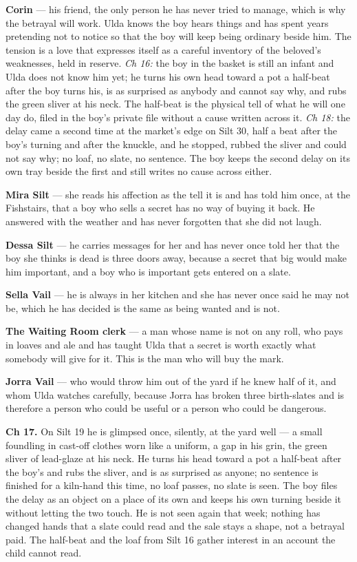 \documentclass{design/chronicle}
\begin{document}
{
\textbf{Corin} — his friend, the only person he has never tried to manage, which is why the betrayal will work. Ulda knows the boy hears things and has spent years pretending not to notice so that the boy will keep being ordinary beside him. The tension is a love that expresses itself as a careful inventory of the beloved’s weaknesses, held in reserve. \emph{Ch 16:} the boy in the basket is still an infant and Ulda does not know him yet; he turns his own head toward a pot a half-beat after the boy turns his, is as surprised as anybody and cannot say why, and rubs the green sliver at his neck. The half-beat is the physical tell of what he will one day do, filed in the boy’s private file without a cause written across it. \emph{Ch 18:} the delay came a second time at the market’s edge on Silt 30, half a beat after the boy’s turning and after the knuckle, and he stopped, rubbed the sliver and could not say why; no loaf, no slate, no sentence. The boy keeps the second delay on its own tray beside the first and still writes no cause across either.

\textbf{Mira Silt} — she reads his affection as the tell it is and has told him once, at the Fishstairs, that a boy who sells a secret has no way of buying it back. He answered with the weather and has never forgotten that she did not laugh.

\textbf{Dessa Silt} — he carries messages for her and has never once told her that the boy she thinks is dead is three doors away, because a secret that big would make him important, and a boy who is important gets entered on a slate.

\textbf{Sella Vail} — he is always in her kitchen and she has never once said he may not be, which he has decided is the same as being wanted and is not.

\textbf{The Waiting Room clerk} — a man whose name is not on any roll, who pays in loaves and ale and has taught Ulda that a secret is worth exactly what somebody will give for it. This is the man who will buy the mark.

\textbf{Jorra Vail} — who would throw him out of the yard if he knew half of it, and whom Ulda watches carefully, because Jorra has broken three birth-slates and is therefore a person who could be useful or a person who could be dangerous.

\textbf{Ch 17.} On Silt 19 he is glimpsed once, silently, at the yard well — a small foundling in cast-off clothes worn like a uniform, a gap in his grin, the green sliver of lead-glaze at his neck. He turns his head toward a pot a half-beat after the boy’s and rubs the sliver, and is as surprised as anyone; no sentence is finished for a kiln-hand this time, no loaf passes, no slate is seen. The boy files the delay as an object on a place of its own and keeps his own turning beside it without letting the two touch. He is not seen again that week; nothing has changed hands that a slate could read and the sale stays a shape, not a betrayal paid. The half-beat and the loaf from Silt 16 gather interest in an account the child cannot read.

}
\end{document}
